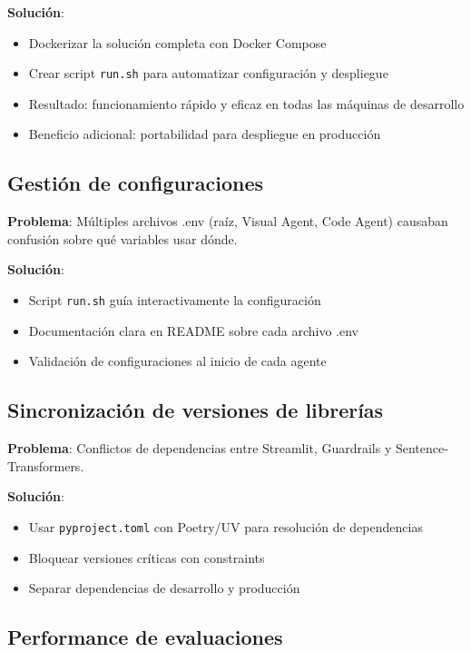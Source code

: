 \documentclass[12pt,a4paper]{article}
\begin{document}
\textbf{Solución}:
\begin{itemize}
    \item Dockerizar la solución completa con Docker Compose
    \item Crear script \texttt{run.sh} para automatizar configuración y despliegue
    \item Resultado: funcionamiento rápido y eficaz en todas las máquinas de desarrollo
    \item Beneficio adicional: portabilidad para despliegue en producción
\end{itemize}

\subsection{Gestión de configuraciones}

\textbf{Problema}: Múltiples archivos .env (raíz, Visual Agent, Code Agent) causaban confusión sobre qué variables usar dónde.

\textbf{Solución}:
\begin{itemize}
    \item Script \texttt{run.sh} guía interactivamente la configuración
    \item Documentación clara en README sobre cada archivo .env
    \item Validación de configuraciones al inicio de cada agente
\end{itemize}

\subsection{Sincronización de versiones de librerías}

\textbf{Problema}: Conflictos de dependencias entre Streamlit, Guardrails y Sentence-Transformers.

\textbf{Solución}:
\begin{itemize}
    \item Usar \texttt{pyproject.toml} con Poetry/UV para resolución de dependencias
    \item Bloquear versiones críticas con constraints
    \item Separar dependencias de desarrollo y producción
\end{itemize}

\subsection{Performance de evaluaciones}
\end{document}
